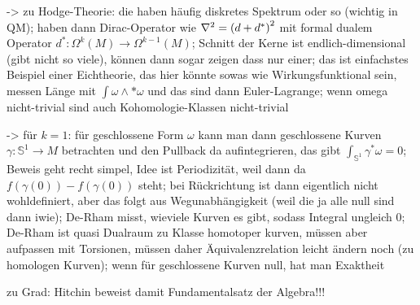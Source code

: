 -> zu Hodge-Theorie: die haben häufig diskretes Spektrum oder so (wichtig in QM); haben dann Dirac-Operator wie $\laplacian = \qty(d + d^*)^2$ mit formal dualem Operator $d^*: \Omega^k(M) \rightarrow \Omega^{k - 1}(M)$; Schnitt der Kerne ist endlich-dimensional (gibt nicht so viele), können dann sogar zeigen dass nur einer; das ist einfachstes Beispiel einer Eichtheorie, das hier könnte sowas wie Wirkungsfunktional sein, messen Länge mit $\int \omega \wedge *\omega$ und das sind dann Euler-Lagrange; wenn omega nicht-trivial sind auch Kohomologie-Klassen nicht-trivial

-> für $k = 1$: für geschlossene Form $\omega$ kann man dann geschlossene Kurven $\gamma: \mathbb{S}^1 \rightarrow M$ betrachten und den Pullback da aufintegrieren, das gibt $\int_{\mathbb{S}^1} \gamma^*\omega = 0$; Beweis geht recht simpel, Idee ist Periodizität, weil dann da $f(\gamma(0)) - f(\gamma(0))$ steht; bei Rückrichtung ist dann eigentlich nicht wohldefiniert, aber das folgt aus Wegunabhängigkeit (weil die ja alle null sind dann iwie); De-Rham misst, wieviele Kurven es gibt, sodass Integral ungleich 0; De-Rham ist quasi Dualraum zu Klasse homotoper kurven, müssen aber aufpassen mit Torsionen, müssen daher Äquivalenzrelation leicht ändern noch (zu homologen Kurven); wenn für geschlossene Kurven null, hat man Exaktheit


zu Grad: Hitchin beweist damit Fundamentalsatz der Algebra!!!



